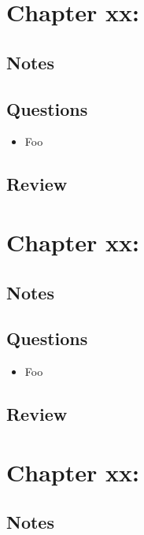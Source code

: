 \section{Chapter xx: }
\subsection{Notes}

\subsection{Questions}
\begin{itemize}
  \item Foo
\end{itemize}

\subsection{Review}

\section{Chapter xx: }
\subsection{Notes}

\subsection{Questions}
\begin{itemize}
  \item Foo
\end{itemize}

\subsection{Review}

\section{Chapter xx: }
\subsection{Notes}

